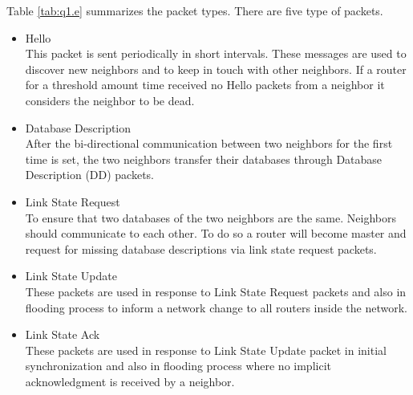 \begin{tcolorbox}
    \mysolution{} 
    Table \ref{tab:q1.e} summarizes the packet types. There are five type of packets. 
        \begin{itemize}
            \item Hello \\
                This packet is sent periodically in short intervals. These messages are used to 
                discover new neighbors and to keep in touch with other neighbors. If a router
                for a threshold amount time received no Hello packets from a neighbor it considers 
                the neighbor to be dead. 
            \item Database Description \\
                After the bi-directional communication between two neighbors for the first time is
                set, the two neighbors transfer their databases through Database Description (DD)
                packets.
            \item Link State Request \\ 
                To ensure that two databases of the two neighbors are the same. Neighbors should 
                communicate to each other. To do so a router will become master and request for missing 
                database descriptions via link state request packets.             
            \item Link State Update \\
                These packets are used in response to Link State Request packets and also 
                in flooding process to inform a network change to all routers
                inside the network.
            \item Link State Ack \\
                These packets are used in response to Link State Update packet in initial synchronization
                and also in flooding process where no implicit acknowledgment is received by a neighbor. 

        \end{itemize}
\end{tcolorbox}

